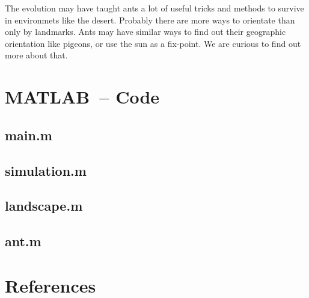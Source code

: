 \documentclass[11pt]{article}
\begin{document}
The evolution may have taught ants a lot of useful tricks and methods to survive in environmets like the desert. Probably there are more ways to orientate than only by landmarks. Ants may have similar ways to find out their geographic orientation like pigeons, or use the sun as a fix-point. We are curious to find out more about that.


\newpage
\section{MATLAB\texttrademark\ -- Code}
\subsection{main.m}

\subsection{simulation.m}

\subsection{landscape.m}

\subsection{ant.m}


\newpage
\section{References}




\listoffigures
\end{document}
